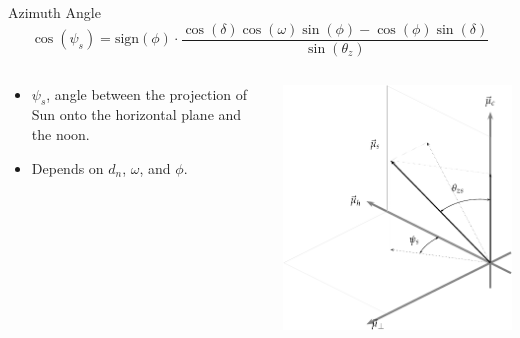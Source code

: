 \documentclass[xcolor={usenames,svgnames,dvipsnames}]{beamer}
\begin{document}
\begin{frame}[plain,label={sec:org7bef086}]{Azimuth Angle}
\[
  \cos(\psi_{s}) = \mathrm{sign}(\phi) \cdot \frac{\cos(\delta) \cos(\omega) \sin(\phi) - \cos(\phi) \sin(\delta)} {\sin(\theta_{z})}
\]

\begin{columns}
\begin{column}{0.55\columnwidth}
\begin{itemize}
\item \(\psi_s\), angle between the projection of Sun onto the horizontal plane and the noon.
\item Depends on \(d_n\), \(\omega\), and \(\phi\).
\end{itemize}
\end{column}

\begin{column}{0.75\columnwidth}
\begin{center}
\includegraphics[width=.9\linewidth]{../figs/SistemaCoordenadasLocal-crop.pdf}
\end{center}
\end{column}
\end{columns}
\end{frame}
\end{document}
